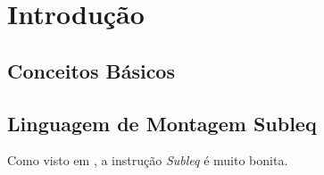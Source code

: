 \chapter{Introdução}

%

\section{Conceitos Básicos}


\section{Linguagem de Montagem Subleq}
\label{sec:subleq}

Como visto em \cite{subleq}, a instrução \textit{Subleq} é muito bonita.

%

